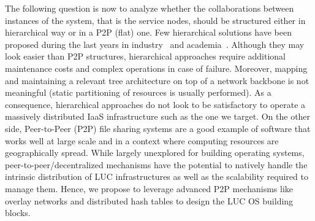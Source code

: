 The following question is now to analyze whether the collaborations between instances of
the system, that is the service nodes, should be structured either in hierarchical way or
in a
P2P (\ie flat) one. Few hierarchical solutions have been proposed during the last years in
industry~\cite{cascading-os, cells} and
academia~\cite{farahnakian:cloudcom14,feller:snooze}. Although they may look easier than
P2P structures, hierarchical approaches require additional maintenance costs and complex
operations in case of failure.
Moreover, mapping and maintaining a relevant tree architecture on top of a network
backbone is not meaningful (static partitioning of resources is usually performed). As a
consequence, hierarchical approaches do not look to be satisfactory to operate a massively
distributed IaaS infrastructure such as the one we target. On the
other side, Peer-to-Peer (P2P)
file sharing systems are a good example of software that works well at large scale and in
a context where computing resources are geographically spread.
%
%
While largely unexplored for building operating systems,
peer-to-peer/decentralized mechanisms have the potential to natively
handle the intrinsic distribution of LUC infrastructures as well as
the scalability required to manage them. Hence, we propose to leverage
advanced P2P mechanisms like overlay networks and distributed hash tables to design the
LUC OS building blocks.



